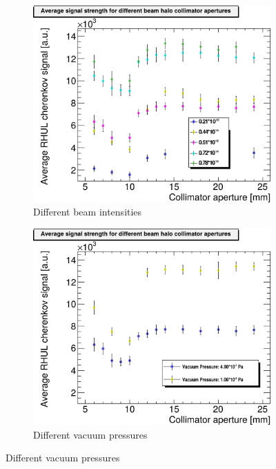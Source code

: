 \begin{figure}
\centering
\begin{subfigure}[b]{0.49\textwidth}
 \centering
 \includegraphics[width=\textwidth]{Figures/ATF/AverageSignal_perAperture.png}
 \caption{Different beam intensities}
\end{subfigure}
\hfill
\begin{subfigure}[b]{0.49\textwidth}
  \centering
 \includegraphics[width=\textwidth]{Figures/ATF/AverageSignal_perAperture_VacuumPressures.png}
 \caption{Different vacuum pressures}
\end{subfigure}

\end{figure}
